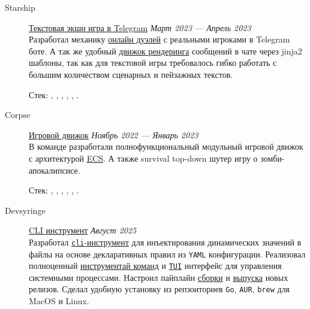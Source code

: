 \documentclass[margin,line]{resume}
\begin{document}
\begin{resume}
\begin{description}
    \item[Starship]\small{\href{https://github.com/starship-crew}{Текстовая
        экшн игра в Telegram}
      \hfill \textsl{Март 2023 — Апрель 2023\vspace{1mm}}}\\
      Разработал механику
      \href{https://github.com/starship-crew/telegram-client/blob/main/app/handlers/fight.py}{онлайн
      дуэлей} с реальными игроками в Telegram боте. А
      так же удобный
      \href{https://github.com/starship-crew/telegram-client/blob/main/app/template.py}{движок
      рендеринга}
      сообщений в чате через jinja2 шаблоны, так как для текстовой игры
      требовалось гибко работать с большим количеством сценарных и
      пейзажных текстов.

      Стек:
      , ,
      ,
      , ,
      .

      \vspace{3mm}

    \item[Corpse]\small{\href{https://github.com/corpse-inc/corpse}{Игровой
        движок}
      \hfill \textsl{Ноябрь 2022 — Январь 2023\vspace{1mm}}}\\
      В команде разработали полнофункциональный модульный
      игровой движок с архитектурой
      \href{https://en.wikipedia.org/wiki/Entity_component_system#:~:text=Entity%E2%80%93component%E2%80%93system%20(ECS,Entity%E2%80%93Component%E2%80%93System%20layout.}{ECS}.
        А также survival top-down шутер игру о зомби-апокалипсисе.

        Стек:
        , ,
        , , ,
        .

        \vspace{3mm}

      \item[Devsyringe]\small{\href{https://github.com/alchemmist/devsyringe}{CLI инструмент}
          \hfill
        \textsl{Август 2025\vspace{1mm}}}\\
        Разработал \href{https://devsyringe.alchemmist.xyz/}{\texttt{cli}-инструмент} для инъектирования динамических значений в файлы на основе декларативных правил из \texttt{YAML} конфигурации. Реализовал полноценный \href{https://github.com/alchemmist/devsyringe/blob/main/internal/cli/commands.go}{инструментай команд} и \href{https://github.com/alchemmist/devsyringe/blob/main/internal/cli/tui/tui.go}{\texttt{TUI}} интерфейс для управления системными процессами. Настроил пайплайн \href{https://github.com/alchemmist/devsyringe/blob/main/.github/workflows/build.yaml}{сборки} и \href{https://github.com/alchemmist/devsyringe/blob/main/.github/workflows/release.yaml}{выпуска} новых релизов. Сделал удобную установку из репзоиториев \texttt{Go}, \texttt{AUR}, \texttt{brew} для MacOS и Linux.


\end{description}
\end{resume}
\end{document}
